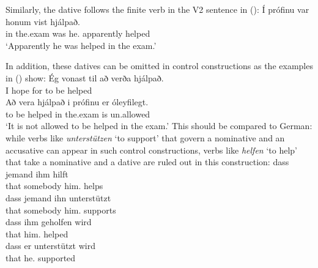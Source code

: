 \noindent
Similarly, the dative follows the finite verb in the V2 sentence in ():
\ea
\gll Í prófinu  var honum vist hjálpað.\\
     in the.exam was he.\DAT{} apparently helped\\\icelandic
\glt `Apparently he was helped in the exam.'
\z

\noindent
In addition, these datives can be omitted in control constructions as the examples in () show:
\eal
\ex
\gll Ég vonast til að verða hjálpað.\\
     I  hope   for to be helped\\\icelandic
\ex
\gll Að vera hjálpað i prófinu er óleyfilegt.\\
     to be helped in the.exam is un.allowed\\
\glt `It is not allowed to be helped in the exam.'
\zl
This should be compared to German: while verbs like \emph{unterstützen} `to support' that govern a
nominative and an accusative can appear in such control constructions, verbs like \emph{helfen} `to
help' that take a nominative and a dative are ruled out in this construction:
\eal
\ex 
\gll dass jemand ihm hilft\\
     that somebody him.\DAT{} helps\\\german
\ex
\gll dass jemand ihn unterstützt\\
     that somebody him.\ACC{} supports\\
\ex
\gll  dass ihm geholfen wird\\
      that him.\DAT{} helped \AUX\\
\ex
\gll  dass er unterstützt wird\\
      that he.\NOM{} supported \AUX\\
\zl

